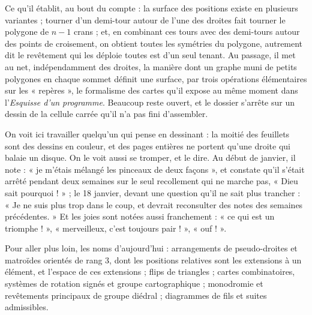 \documentclass[11pt,a4paper]{article}
\begin{document}
\begin{resume}
Ce qu'il établit, au bout du compte : la surface des positions existe en
plusieurs variantes ; tourner d'un demi-tour autour de l'une des droites fait
tourner le polygone de $n - 1$ crans ; et, en combinant ces tours avec
des demi-tours autour des points de croisement, on obtient toutes les
symétries du polygone, autrement dit le revêtement qui les déploie toutes est
d'un seul tenant. Au passage, il met au net, indépendamment des droites, la manière dont
un graphe muni de petits polygones en chaque sommet définit une surface, par
trois opérations élémentaires sur les « repères », le formalisme des cartes
qu'il expose au même moment dans l'\emph{Esquisse d'un programme}. Beaucoup
reste ouvert, et le dossier s'arrête sur un dessin de la cellule carrée qu'il
n'a pas fini d'assembler.

On voit ici travailler quelqu'un qui pense en dessinant : la moitié des
feuillets sont des dessins en couleur, et des pages entières ne portent qu'une
droite qui balaie un disque. On le voit aussi se tromper, et le dire. Au début de
janvier, il note : « je m'étais mélangé les pinceaux de deux façons », et
constate qu'il s'était arrêté pendant deux semaines sur le seul recollement qui
ne marche pas, « Dieu sait pourquoi ! » ; le 18 janvier, devant une question
qu'il ne sait plus trancher : « Je ne suis plus trop dans le coup, et devrait
reconsulter des notes des semaines précédentes. » Et les joies sont notées
aussi franchement : « ce qui est un triomphe ! », « merveilleux, c'est toujours
pair ! », « ouf ! ».

Pour aller plus loin, les noms d'aujourd'hui : arrangements de pseudo-droites
et matroïdes orientés de rang $3$, dont les positions relatives sont les
extensions à un élément, et l'espace de ces extensions ; flips de triangles ;
cartes combinatoires, systèmes de rotation signés et groupe cartographique ;
monodromie et revêtements principaux de groupe diédral ; diagrammes de fils et
suites admissibles.

\end{resume}
\end{document}
